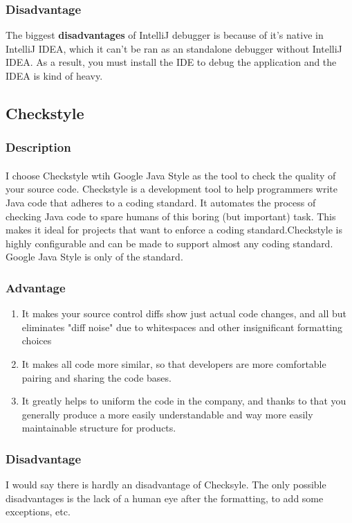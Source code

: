 \documentclass[10pt]{article}
\begin{document}
\subsubsection{Disadvantage}
The biggest \textbf{disadvantages} of IntelliJ debugger is because of it's native in IntelliJ IDEA, which it can't be ran as an standalone debugger without IntelliJ IDEA. As a result, you must install the IDE to debug the application and the IDEA is kind of heavy.


\pagebreak
\subsection{Checkstyle}

\subsubsection{Description}
\paragraph{}
I choose Checkstyle wtih Google Java Style as the tool to check the quality of your source code. Checkstyle is a development tool to help programmers write Java code that adheres to a coding standard. It automates the process of checking Java code to spare humans of this boring (but important) task. This makes it ideal for projects that want to enforce a coding standard.Checkstyle is highly configurable and can be made to support almost any coding standard. Google Java Style is only of the standard.

\subsubsection{Advantage}
\begin{enumerate}
    \item It makes your source control diffs show just actual code changes, and all but eliminates "diff noise" due to whitespaces and other insignificant formatting choices
    \item It makes all code more similar, so that developers are more comfortable pairing and sharing the code bases.
    \item It greatly helps to uniform the code in the company, and thanks to that you generally produce a more easily understandable and way more easily maintainable structure for products.
\end{enumerate}

\subsubsection{Disadvantage}
I would say there is hardly an disadvantage of Checksyle. The only possible disadvantages is the lack of a human eye after the formatting, to add some exceptions, etc. 
\end{document}
